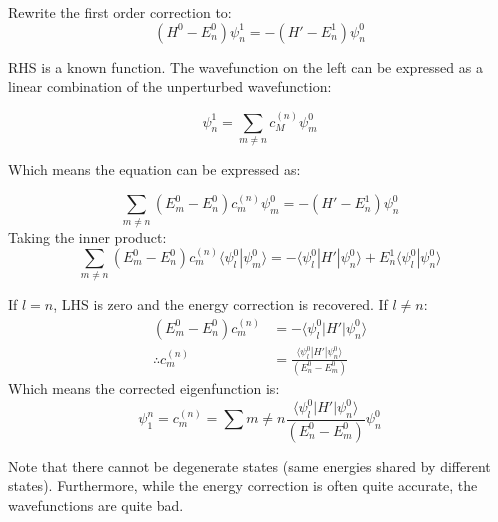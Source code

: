 \documentclass[12pt]{article}
\begin{document}
Rewrite the first order correction to:
\[(H^0- E^0_n)\psi^1_n=-(H'-E^1_n)\psi^0_n\]

RHS is a known function. The wavefunction on the left can be expressed as a linear combination of the unperturbed wavefunction:

\[\psi^1_n = \sum_{m\neq n}c_M^{(n)}\psi^0_m\]

Which means the equation can be expressed as:

\[\sum_{m\neq n} (E^0_m-E^0_n)c_m^{(n)}\psi^0_m = -(H'-E^1_n)\psi^0_n\]
Taking the inner product:
\[\sum_{m\neq n} (E^0_m-E^0_n)c_m^{(n)}\langle\psi_l^0|\psi^0_m\rangle = -\langle\psi^0_l|H'|\psi^0_n\rangle+E^1_n\langle\psi^0_l|\psi^0_n\rangle\]

If $l = n$, LHS is zero and the energy correction is recovered. If $l\neq n$:
\begin{align*}
    (E^0_m - E^0_n)c^{(n)}_m &= -\langle\psi^0_l|H'|\psi^0_n\rangle\\
    \therefore c^{(n)}_m &= \frac{\langle\psi^0_l|H'|\psi^0_n\rangle}{(E^0_n- E^0_m)}
\end{align*}
Which means the corrected eigenfunction is:
\[\boxed{\psi^n_1 = c^{(n)}_m = \sum{m\neq n}\frac{\langle\psi^0_l|H'|\psi^0_n\rangle}{(E^0_n- E^0_m)}\psi^0_n}\]

Note that there cannot be degenerate states (same energies shared by different states). Furthermore, while the energy correction is often quite accurate, the wavefunctions are quite bad.
\end{document}
